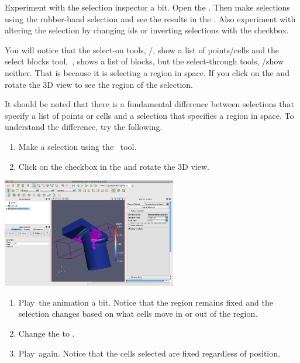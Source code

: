 Experiment with the selection inspector a bit.  Open the .  Then make selections using the rubber-band selection and see
the results in the .  Also experiment with
altering the selection by changing ids or inverting selections with the
 checkbox.

You will notice that the select-on tools, \selectCellsOn/\selectPointsOn,
show a list of points/cells and the select blocks tool,~\selectBlocks,
shows a list of blocks, but the select-through tools,
\selectCellsThrough/\selectPointsThrough show neither.  That is because it
is selecting a region in space.  If you click on the  and
rotate the 3D view to see the region of the selection.

It should be noted that there is a fundamental difference between
selections that specify a list of points or cells and a selection that
specifies a region in space.  To understand the difference, try the
following.

\begin{enumerate}
\item Make a selection using the ~\selectCellsThrough tool.
\item Click on the  checkbox in the  and rotate the 3D view.
  \savecounter
\end{enumerate}

\begin{inlinefig}
  \includegraphics[width=3in]{images/SelectionFrustum}
\end{inlinefig}

\begin{enumerate}
  \restorecounter
\item Play~\vcrPlay the animation a bit.  Notice that the region remains
  fixed and the selection changes based on what cells move in or out of the
  region.
\item Change the  to .
\item Play~\vcrPlay again.  Notice that the cells selected are fixed
  regardless of position.
\end{enumerate}


